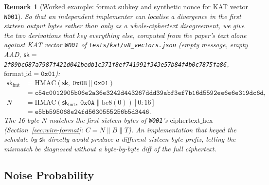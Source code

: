 \documentclass[11pt,a4paper]{article}
\newtheorem{remark}[theorem]{Remark}
\begin{document}
\begin{remark}[Worked example: format subkey and synthetic nonce for
KAT vector \texttt{W001}]\label{rem:fmtkey-example}
So that an independent implementer can localise a divergence in the
first sixteen output bytes rather than only as a whole-ciphertext
disagreement, we give the two derivations that key everything else,
computed from the paper's text alone against KAT vector \texttt{W001}
of \texttt{tests/kat/v8\_vectors.json} (empty message, empty AAD,
$\mathsf{sk}=$ \texttt{2f89bc687a7987f421d041bedb1c371f8ef741991f343e57b84f4b0c7875fa86},
$\mathrm{format\_id}=\texttt{0x01}$):
\begin{align*}
  \mathsf{sk}_{\mathrm{fmt}}
    &= \mathrm{HMAC}(\mathsf{sk},\ \texttt{0x0B}\|\texttt{0x01}) \\
    &= \texttt{c54c0012905b06e2a36e3242d443267ddd39abf3ef7b16d5592ee6e6e319dc6d}, \\[0.5ex]
  N
    &= \mathrm{HMAC}(\mathsf{sk}_{\mathrm{fmt}},\ \texttt{0x0A}\|\mathrm{be8}(0))[0{:}16] \\
    &= \texttt{e5bb595068e24fd5630555256b5d3446}.
\end{align*}
The 16-byte $N$ matches the first sixteen bytes of \texttt{W001}'s
$\mathrm{ciphertext\_hex}$ (Section~\ref{sec:wire-format}: $C=N\|B\|T$).
An implementation that keyed the schedule by $\mathsf{sk}$ directly would
produce a different sixteen-byte prefix, letting the mismatch be
diagnosed without a byte-by-byte diff of the full ciphertext.
\end{remark}

\subsection{Noise Probability}
\label{sec:noiseprob}
\end{document}
